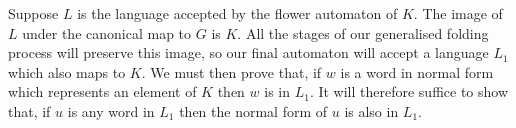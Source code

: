 \documentclass[a4paper,12pt]{article}
\newcommand{\G}{\Gamma }
\numberwithin{equation}{section}
\numberwithin{figure}{section}
\newcommand{\FF}{\ensuremath{\mathbb{F}}}
\begin{document}
 Suppose $L$ is the
language accepted by the flower automaton of $K$. The image of $L$ under
the canonical map to $G$ is $K$. All the stages of our generalised folding
process will preserve this image, so our final automaton will accept a language
$L_1$ which also maps to $K$. We must then prove that, if $w$ is a word
in normal form which represents an element of $K$ then $w$ is in $L_1$. It will
therefore suffice to show that, if $u$ is any word in $L_1$ then the
normal form of $u$ is also in $L_1$.

\end{document}
